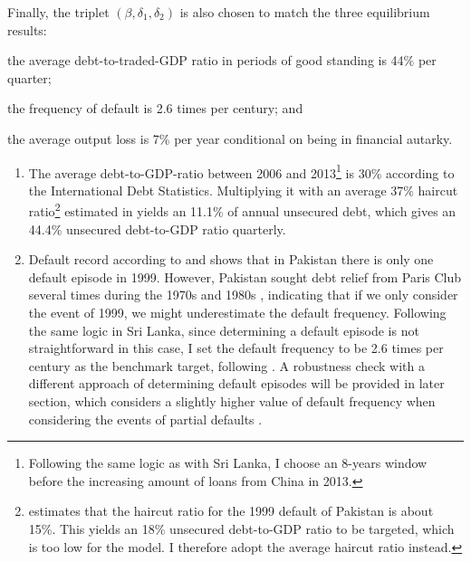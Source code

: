 Finally, the triplet $\left( \beta, \delta_1, \delta_2 \right)$ is also chosen to match the three equilibrium results:
\begin{enumerate*}[label = (\roman*)]
    \item the average debt-to-traded-GDP ratio in periods of good standing is 44\% per quarter;
    \item the frequency of default is 2.6 times per century; and
    \item the average output loss is 7\% per year conditional on being in financial autarky.
\end{enumerate*}
\begin{enumerate}[label = (\roman*)]
    \item
    The average debt-to-GDP-ratio between 2006 and 2013\footnote{
    Following the same logic as with Sri Lanka, I choose an 8-years window before the increasing amount of loans from China in 2013.}
    is 30\% according to the International Debt Statistics. Multiplying it with an average 37\% haircut ratio\footnote{\citet{Cruces-Trebesch-13} estimates that the haircut ratio for the 1999 default of Pakistan is about 15\%. This yields an 18\% unsecured debt-to-GDP ratio to be targeted, which is too low for the model. I therefore adopt the average haircut ratio instead.} estimated in \citet{Cruces-Trebesch-13} yields an 11.1\% of annual unsecured debt, which gives an 44.4\% unsecured debt-to-GDP ratio quarterly.
    \item Default record according to \citet{SPGlobal-default-report} and \citet{Uribe-Schmitt-Grohe-textbook} shows that in Pakistan there is only one default episode in 1999. However, Pakistan sought debt relief from Paris Club several times during the 1970s and 1980s \citep{pakistan-default-start}, indicating that if we only consider the event of 1999, we might underestimate the default frequency\footnotemark{}. Following the same logic in Sri Lanka, since determining a default episode is not straightforward in this case, I set the default frequency to be 2.6 times per century as the benchmark target, following \citet{Na-18}. A robustness check with a different approach of determining default episodes will be provided in later section, which considers a slightly higher value of default frequency when considering the events of partial defaults \citep{Arellano-23-parial-default}.
\end{enumerate}
